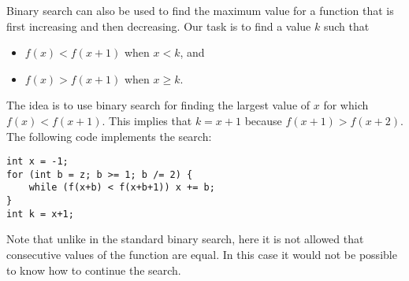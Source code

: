 Binary search can also be used to find
the maximum value for a function that is
first increasing and then decreasing.
Our task is to find a value $k$ such that

\begin{itemize}
\item
$f(x)<f(x+1)$ when $x<k$, and
\item
$f(x)>f(x+1)$ when $x \ge k$.
\end{itemize}

The idea is to use binary search
for finding the largest value of $x$
for which $f(x)<f(x+1)$.
This implies that $k=x+1$
because $f(x+1)>f(x+2)$.
The following code implements the search: 

\begin{lstlisting}
int x = -1;
for (int b = z; b >= 1; b /= 2) {
    while (f(x+b) < f(x+b+1)) x += b;
}
int k = x+1;
\end{lstlisting}

Note that unlike in the standard binary search,
here it is not allowed that consecutive values
of the function are equal.
In this case it would not be possible to know
how to continue the search.